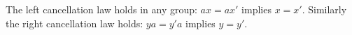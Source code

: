 The left cancellation law holds in any group: $ax = ax'$ implies $x = x'$. Similarly the right cancellation law holds: $ya = y'a$ implies $y = y'$.

